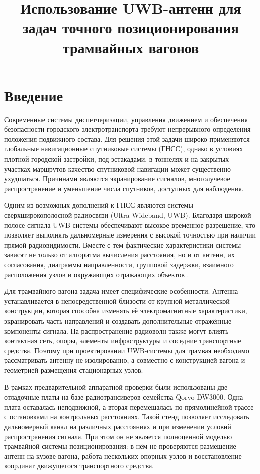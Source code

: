 \documentclass{misisarticle}
\title{Использование UWB-антенн для задач точного позиционирования трамвайных вагонов}
\begin{document}
\maketitle

\section{Введение}

Современные системы диспетчеризации, управления движением и обеспечения безопасности городского электротранспорта требуют непрерывного определения положения подвижного состава. Для решения этой задачи широко применяются глобальные навигационные спутниковые системы (ГНСС), однако в условиях плотной городской застройки, под эстакадами, в тоннелях и на закрытых участках маршрутов качество спутниковой навигации может существенно ухудшаться. Причинами являются экранирование сигналов, многолучевое распространение и уменьшение числа спутников, доступных для наблюдения.

Одним из возможных дополнений к ГНСС являются системы сверхширокополосной радиосвязи (Ultra-Wideband, UWB). Благодаря широкой полосе сигнала UWB-системы обеспечивают высокое временное разрешение, что позволяет выполнять дальномерные измерения с высокой точностью при наличии прямой радиовидимости. Вместе с тем фактические характеристики системы зависят не только от алгоритма вычисления расстояния, но и от антенн, их согласования, диаграммы направленности, групповой задержки, взаимного расположения узлов и окружающих отражающих объектов \cite{fernandez2007application,queralta2020uwb,huang2024design}.

Для трамвайного вагона задача имеет специфические особенности. Антенна устанавливается в непосредственной близости от крупной металлической конструкции, которая способна изменять её электромагнитные характеристики, экранировать часть направлений и создавать дополнительные отражённые компоненты сигнала. На распространение радиоволн также могут влиять контактная сеть, опоры, элементы инфраструктуры и соседние транспортные средства. Поэтому при проектировании UWB-системы для трамвая необходимо рассматривать антенну не изолированно, а совместно с конструкцией вагона и геометрией размещения стационарных узлов.

В рамках предварительной аппаратной проверки были использованы две отладочные платы на базе радиотрансиверов семейства Qorvo DW3000. Одна плата оставалась неподвижной, а вторая перемещалась по прямолинейной трассе с остановками на контрольных расстояниях. Такой стенд позволяет исследовать дальномерный канал на различных расстояниях и при изменении условий распространения сигнала. При этом он не является полноценной моделью трамвайной системы позиционирования: в нём не проверяются размещение антенн на кузове вагона, работа нескольких опорных узлов и восстановление координат движущегося транспортного средства.
\end{document}
